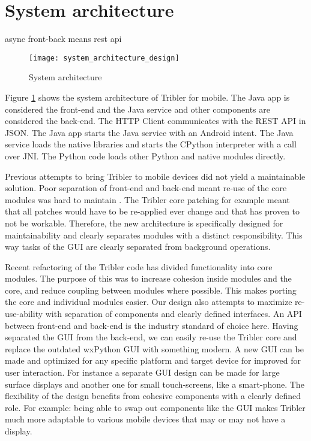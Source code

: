 \section{System architecture}

async front-back means rest api


\begin{figure}[H]
	\centering
	\texttt{[image: system\_architecture\_design]}
	\caption{System architecture}
	\label{fig:system_architecture_design}
\end{figure}

Figure \ref{fig:system_architecture_design} shows the system architecture of Tribler for mobile.
The Java app is considered the front-end and the Java service and other components are considered the back-end.
The HTTP Client communicates with the REST API in JSON.
The Java app starts the Java service with an Android intent.
The Java service loads the native libraries and starts the CPython interpreter with a call over JNI.
The Python code loads other Python and native modules directly.

Previous attempts to bring Tribler to mobile devices did not yield a maintainable solution.
Poor separation of front-end and back-end meant re-use of the core modules was hard to maintain \cite{bsc1,2}.
The Tribler core patching \cite{bsc3} for example meant that all patches would have to be re-applied ever change and that has proven to not be workable.
Therefore, the new architecture is specifically designed for maintainability and clearly separates modules with a distinct responsibility.
This way tasks of the GUI are clearly separated from background operations.

Recent refactoring of the Tribler code \cite{thesis_martijn} has divided functionality into core modules.
The purpose of this was to increase cohesion inside modules and the core, and reduce coupling between modules where possible.
This makes porting the core and individual modules easier.
Our design also attempts to maximize re-use-ability with separation of components and clearly defined interfaces.
An API between front-end and back-end is the industry standard of choice here.
Having separated the GUI from the back-end, we can easily re-use the Tribler core and replace the outdated wxPython GUI with something modern.
A new GUI can be made and optimized for any specific platform and target device for improved for user interaction.
For instance a separate GUI design can be made for large surface displays and another one for small touch-screens, like a smart-phone.
The flexibility of the design benefits from cohesive components with a clearly defined role.
For example: being able to swap out components like the GUI makes Tribler much more adaptable to various mobile devices that may or may not have a display.




